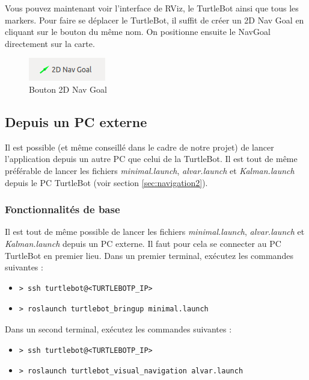 \documentclass[10pt,a4paper]{article}
\begin{document}
Vous pouvez maintenant voir l'interface de RViz, le TurtleBot ainsi que tous les markers.
Pour faire se déplacer le TurtleBot, il suffit de créer un 2D Nav Goal en cliquant sur le bouton du même nom. On positionne ensuite le NavGoal directement sur la carte.\\
\begin{figure}[!h]
  \centering
  \noindent\includegraphics[scale=0.5]{2DNavGoal.png} 
  \caption{Bouton 2D Nav Goal}
\end{figure}

\subsection{Depuis un PC externe}

Il est possible (et même conseillé dans le cadre de notre projet) de lancer l'application depuis un autre PC que celui de la TurtleBot.
Il est tout de même préférable de lancer les fichiers \upshape \emph{minimal.launch}, \upshape \emph{alvar.launch} et \upshape \emph{Kalman.launch} depuis le PC TurtleBot (voir section \ref{sec:navigation2}).

\subsubsection{Fonctionnalités de base}

Il est tout de même possible de lancer les fichiers \upshape \emph{minimal.launch}, \upshape \emph{alvar.launch} et \upshape \emph{Kalman.launch} depuis un PC externe. Il faut pour cela se connecter au PC TurtleBot en premier lieu.
Dans un premier terminal, exécutez les commandes suivantes :

\begin{itemize}
\item[]  \begin{verbatim}> ssh turtlebot@<TURTLEBOTP_IP> \end{verbatim}
\item[]  \begin{verbatim}> roslaunch turtlebot_bringup minimal.launch \end{verbatim}
\end{itemize}

Dans un second terminal, exécutez les commandes suivantes :

\begin{itemize}
\item[]  \begin{verbatim}> ssh turtlebot@<TURTLEBOTP_IP> \end{verbatim}
\item[]  \begin{verbatim}> roslaunch turtlebot_visual_navigation alvar.launch \end{verbatim}
\end{itemize}
\end{document}
